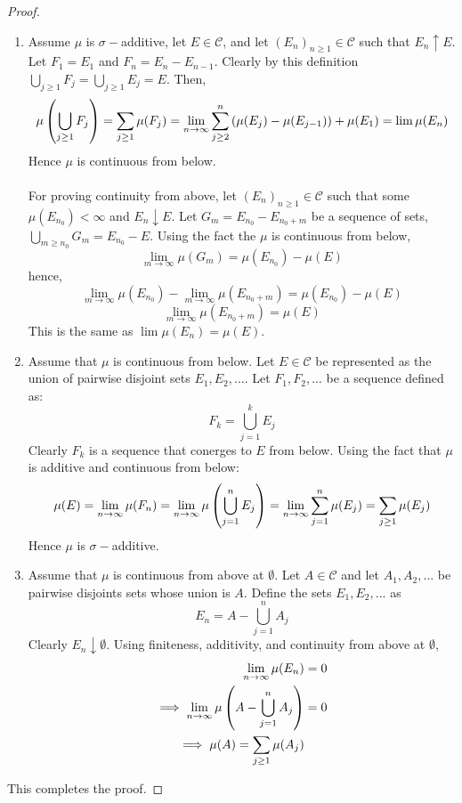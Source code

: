 \begin{proof}
  \begin{enumerate}
    \item Assume $\mu$ is $\sigma-$additive, let $E\in \mathscr{C}$, and let $(E_n)_{n\geq 1}\in \mathscr{C}$ such that $E_n \uparrow E$. Let $F_1 = E_1$ and $F_n = E_n-E_{n-1}$. Clearly by this definition $\bigcup_{j\geq 1} F_j = \bigcup_{j\geq 1} E_j = E$. Then,
      \[\mu\left(\bigcup_{j\geq 1} F_j\right) = \sum_{j\geq 1}\mu(F_j) = \lim_{n\to\infty}\sum_{j\geq 2}^n\left(\mu(E_j)- \mu(E_{j-1})\right) + \mu(E_1) = \lim\mu(E_n)\]
      Hence $\mu$ is continuous from below. 
      \paragraph{} For proving continuity from above, let $(E_n)_{n\geq 1}\in \mathscr{C}$ such that some $\mu(E_{n_0}) <\infty$ and $E_n \downarrow E$. Let $G_m = E_{n_0} - E_{n_0+m}$ be a sequence of sets, $\bigcup_{m\geq n_0} G_m = E_{n_0} - E$. Using the fact the $\mu$ is continuous from below,
      \[\lim_{m\to\infty}\mu(G_m) = \mu(E_{n_0}) - \mu(E)\]
      hence,
      \[\lim_{m\to\infty}\mu(E_{n_0}) - \lim_{m\to\infty}\mu(E_{n_0+m}) = \mu(E_{n_0}) - \mu(E)\]
      \[\lim_{m\to\infty}\mu(E_{n_0+m}) = \mu(E)\]
      This is the same as $\lim \mu(E_n) = \mu(E)$.
    \item Assume that $\mu$ is continuous from below. Let $E\in \mathscr{C}$ be represented as the union of pairwise disjoint sets $E_1, E_2,...$. Let $F_1,F_2,...$ be a sequence defined as:
      \[F_k = \bigcup_{j=1}^{k} E_j\]
      Clearly $F_k$ is a sequence that conerges to $E$ from below. Using the fact that $\mu$ is additive and continuous from below:
      \[\mu(E) = \lim_{n\to\infty}\mu(F_n) = \lim_{n\to\infty} \mu\left(\bigcup_{j=1}^n E_j\right) = \lim_{n\to\infty}\sum_{j=1}^{n}\mu(E_j) = \sum_{j\geq 1}\mu(E_j)\]
      Hence $\mu$ is $\sigma-$additive.
    \item Assume that $\mu$ is continuous from above at $\emptyset$. Let $A\in \mathscr{C}$ and let $A_1, A_2,...$ be pairwise disjoints sets whose union is $A$. Define the sets $E_1, E_2,...$ as
      \[E_n = A - \bigcup_{j=1}^nA_j\]
      Clearly $E_n\downarrow \emptyset$. Using finiteness, additivity, and continuity from above at $\emptyset$,
      \begin{align*}
        \lim_{n\to\infty}\mu(E_n) &= 0\\
        \implies \lim_{n\to\infty} \mu\left(A - \bigcup_{j=1}^nA_j\right) &= 0\\
        \implies \mu(A) = \sum_{j\geq 1} \mu(A_j)
      \end{align*}
  \end{enumerate}
  This completes the proof.
\end{proof}
